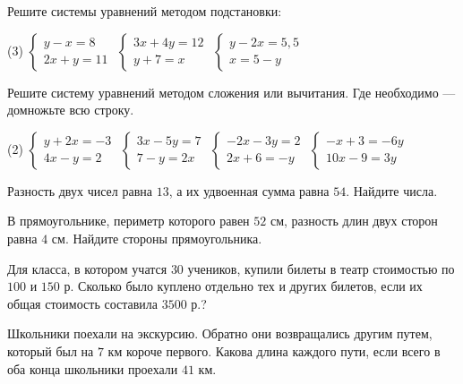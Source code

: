 \begin{class}[number=4]
	\begin{listofex}
		\item Решите системы уравнений методом подстановки:
		\begin{tasks}(3)
			\task \( \begin{cases} y-x=8 \\ 2x+y=11 \end{cases} \)
			\task \( \begin{cases} 3x+4y = 12 \\ y+7=x \end{cases} \)
			\task \( \begin{cases} y-2x=5,5 \\ x=5-y \end{cases} \)
		\end{tasks}
		\item Решите систему уравнений методом сложения или вычитания. Где необходимо --- домножьте всю строку.
		\begin{tasks}(2)
			\task \( \begin{cases} y+2x=-3 \\ 4x-y=2 \end{cases} \)
			\task \( \begin{cases} 3x-5y=7 \\ 7-y=2x \end{cases} \)
			\task \( \begin{cases} -2x-3y=2 \\ 2x+6=-y \end{cases} \)
			\task \( \begin{cases} -x+3=-6y \\ 10x-9=3y \end{cases} \)
		\end{tasks}
		\item Разность двух чисел равна \(13\), а их удвоенная сумма равна \(54\). Найдите числа.
		\item В прямоугольнике, периметр которого равен \(52\) см, разность длин двух сторон равна \(4\) см. Найдите стороны прямоугольника.
		\item Для класса, в котором учатся \(30\) учеников, купили билеты в театр стоимостью по \(100\) и \(150\) р. Сколько было куплено отдельно тех и других билетов, если их общая стоимость составила \(3500\) р.?
		\item Школьники поехали на экскурсию. Обратно они возвращались другим путем, который был на \(7\) км короче первого. Какова длина каждого пути, если всего в оба конца школьники проехали \(41\) км.

\end{listofex}
\end{class}
